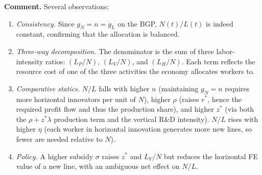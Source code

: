 \documentclass[11pt]{exam}
\begin{document}
\begin{questions}
\begin{solution}
\textbf{Comment.}  Several observations:
\begin{enumerate}
	\item \textit{Consistency.}  Since $g_{N}=n=g_{L}$ on the BGP, $N(t)/L(t)$ is indeed constant, confirming that the allocation is balanced.
	\item \textit{Three-way decomposition.}  The denominator is the sum of three labor-intensity ratios: $(L_{P}/N)$, $(L_{V}/N)$, and $(L_{H}/N)$.  Each term reflects the resource cost of one of the three activities the economy allocates workers to.
	\item \textit{Comparative statics.}  $N/L$ falls with higher $n$ (maintaining $g_{N}=n$ requires more horizontal innovators per unit of $N$), higher $\rho$ (raises $r^{*}$, hence the required profit flow and thus the production share), and higher $z^{*}$ (via both the $\rho+z^{*}\lambda$ production term and the vertical R\&D intensity).  $N/L$ rises with higher $\eta$ (each worker in horizontal innovation generates more new lines, so fewer are needed relative to $N$).
	\item \textit{Policy.}  A higher subsidy $\sigma$ raises $z^{*}$ and $L_{V}/N$ but reduces the horizontal FE value of a new line, with an ambiguous net effect on $N/L$.
\end{enumerate}
\end{solution}

\end{questions}
\end{document}
